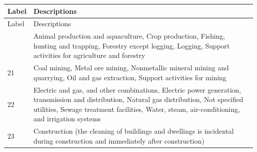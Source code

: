 \begin{longtable}{lp{18cm}}
\hline
Label & Descriptions \\
\hline
\endfirsthead
\hline
Label & Descriptions \\
\hline
\endhead
\hline
\endfoot
\hline
\endlastfoot
11 & Animal production and aquaculture, Crop production, Fishing, hunting and trapping, Forestry except logging, Logging, Support activities for agriculture and forestry \\ 
  21 & Coal mining, Metal ore mining, Nonmetallic mineral mining and quarrying, Oil and gas extraction, Support activities for mining \\ 
  22 & Electric and gas, and other combinations, Electric power generation, transmission and distribution, Natural gas distribution, Not specified utilities, Sewage treatment facilities, Water, steam, air-conditioning, and irrigation systems \\ 
  23 & Construction (the cleaning of buildings and dwellings is incidental during construction and immediately after construction) \\ 

\end{longtable}
